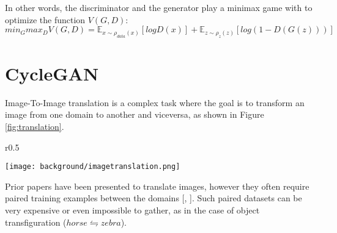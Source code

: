 In other words, the discriminator and the generator play a minimax game with to optimize the function $V(G,D)$:
\begin{equation}
  \label{eq:ganloss}
  min_G max_D V(G,D) = \mathbb{E}_{x\sim \rho_{data}(x)}[log D(x)] + \mathbb{E}_{z\sim \rho_{z}(z)}[log (1-D(G(z)))]
\end{equation}

\section{CycleGAN}
Image-To-Image translation is a complex task where the goal is to transform an image from one domain to another and viceversa, as shown in Figure \ref{fig:translation}.
\begin{wrapfigure}{r}{0.5\textwidth}
  \begin{center}
    \texttt{[image: background/imagetranslation.png]}
  \end{center}
  \caption{Image-to-image translation example \citep{CycleGAN2017}.}
  \label{fig:translation}
\end{wrapfigure}
Prior papers have been presented to translate images, however they often require paired training examples between the domains [\citet{https://doi.org/10.48550/arxiv.1612.00835}, \citet{karakan}].
Such paired datasets can be very expensive or even impossible to gather, as in the case of object transfiguration ($horse \leftrightharpoons zebra$).

